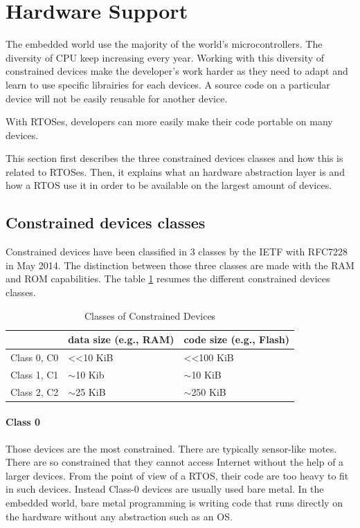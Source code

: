 \section{Hardware Support}

The embedded world use the majority of the world's microcontrollers.
The diversity of CPU keep increasing every year.
Working with this diversity of constrained devices make the developer's work harder as they need to adapt and learn to use specific librairies for each devices.
A source code on a particular device will not be easily reusable for another device.

With RTOSes, developers can more easily make their code portable on many devices.

This section first describes the three constrained devices classes and how this is related to RTOSes.
Then, it explains what an hardware abstraction layer is and how a RTOS use it in order to be available on the largest amount of devices.

\subsection{Constrained devices classes}

Constrained devices have been classified in 3 classes by the IETF with RFC7228 in May 2014. The distinction between those three classes are made with the RAM and ROM capabilities.
The table \ref{tab:constrained-devices-classes} resumes the different constrained devices classes.

\begin{table}[!h]
  \centering
  \begin{tabular}{|l|l|l|}
  \hline
   & data size (e.g., RAM) & code size (e.g., Flash) \\ \hline
  Class 0, C0 & \textless{}\textless 10 KiB & \textless{}\textless 100 KiB \\ %
  Class 1, C1 & $\sim$10 Kib & $\sim$10 KiB \\ %
  Class 2, C2 & $\sim$25 KiB & $\sim$250 KiB \\ \hline
  \end{tabular}
  \caption{Classes of Constrained Devices}
  \label{tab:constrained-devices-classes}
\end{table}

\paragraph{Class 0}
Those devices are the most constrained.
There are typically sensor-like motes.
There are so constrained that they cannot access Internet without the help of a larger devices.
From the point of view of a RTOS, their code are too heavy to fit in such devices.
Instead Class-0 devices are usually used bare metal.
In the embedded world, bare metal programming is writing code that runs directly on the hardware without any abstraction such as an OS.

